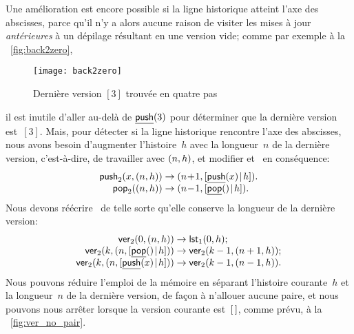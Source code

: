 Une amélioration est encore possible si la ligne historique atteint
l'axe des abscisses, parce qu'il n'y a alors aucune raison de visiter
les mises à jour \emph{antérieures} à un dépilage résultant en une
version vide; comme par exemple à la \fig~\vref{fig:back2zero},
\begin{figure}[b]
\centering
\texttt{[image: back2zero]}
\caption{Dernière version $[3]$ trouvée en quatre pas}
\label{fig:back2zero}
\end{figure}
il est inutile d'aller au-delà de
\(\underline{\textsf{push}}(3)\) pour déterminer que la
dernière version est~\([3]\). Mais, pour détecter si la ligne
historique rencontre l'axe des abscisses, nous avons besoin
d'augmenter l'histoire~\(h\) avec la longueur~\(n\) de la dernière
version, c'est-à-dire, de travailler avec \(({n},{h})\), et modifier
et~ en conséquence:
\begin{equation*}
\begin{array}{@{}r@{\;}l@{\;}l@{}}
\fun{push}_2(x,\pair{n}{h}) & \rightarrow &
\pair{n\!+\!1}{\cons{\ufun{push}(x)}{h}}.\\
\fun{pop}_2(\pair{n}{h}) & \rightarrow &
\pair{n\!-\!1}{\cons{\ufun{pop}()}{h}}.
\end{array}
\end{equation*}
Nous devons réécrire~ de
telle sorte qu'elle conserve la longueur de la dernière version:
\begin{equation*}
\begin{array}{@{}r@{\;}l@{\;}l@{}}
\fun{ver}_2(0,\pair{n}{h}) & \rightarrow & \fun{lst}_1(0,h);\\
\fun{ver}_2(k,\pair{n}{\cons{\ufun{pop}()}{h}})
                      & \rightarrow & \fun{ver}_2(k-1,\pair{n+1}{h});\\
\fun{ver}_2(k,\pair{n}{\cons{\ufun{push}(x)}{h}})
                      & \rightarrow & \fun{ver}_2(k-1,\pair{n-1}{h}).
\end{array}
\end{equation*}
Nous pouvons réduire l'emploi de la mémoire en
séparant l'histoire courante~\(h\) et la longueur~\(n\) de la dernière
version, de façon à n'allouer aucune paire, et nous pouvons nous
arrêter lorsque la version courante est~\([\,]\), comme prévu, à la
\fig~\vref{fig:ver_no_pair}.
